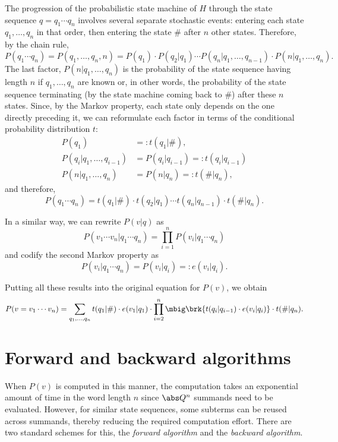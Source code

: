 The progression of the probabilistic state machine of $H$ through the state
sequence $q=q_1\cdots q_n$ involves several separate stochastic events:
entering each state $q_1,\ldots,q_n$ in that order, then entering the state
$\#$ after $n$ other states. Therefore, by the chain rule,
\[
 P(q_1\cdots q_n) = P(q_1,\ldots,q_n,n) = P(q_1) \cdot P(q_2|q_1) \cdots P(q_n|q_1,\ldots,q_{n-1}) \cdot P(n|q_1,\ldots,q_n).
\]
The last factor, $P(n|q_1,\ldots,q_n)$ is the probability of the state sequence
having length $n$ if $q_1,\ldots,q_n$ are known or, in other words, the
probability of the state sequence terminating (by the state machine coming back
to $\#$) after these $n$ states. Since, by the Markov property, each state only
depends on the one directly preceding it, we can reformulate each factor in
terms of the conditional probability distribution $t$:
\begin{align*}
 P(q_1) &=: t(q_1|\#), \\
 P(q_i|q_1,\ldots,q_{i-1}) &= P(q_i|q_{i-1}) =: t(q_i|q_{i-1}) \\
 P(n|q_1,\ldots,q_n) &= P(n|q_n) =: t(\#|q_n),
\end{align*}
and therefore,
\[
 P(q_1\cdots q_n) = t(q_1|\#) \cdot t(q_2|q_1) \cdots t(q_n|q_{n-1}) \cdot t(\#|q_n).
\]

In a similar way, we can rewrite $P(v|q)$ as
\[
 P(v_1\cdots v_n|q_1\cdots q_n) = \prod_{i=1}^n P(v_i|q_1\cdots q_n)
\]
and codify the second Markov property as
\[
 P(v_i|q_1\cdots q_n) = P(v_i|q_i) =: e(v_i|q_i).
\]

Putting all these results into the original equation for $P(v)$, we obtain
\[
 P(v=v_1\cdots v_n) = \sum_{q_1,\ldots,q_n} t(q_1|\#) \cdot e(v_1|q_1) \cdot \prod_{i=2}^n \mbig\brk{t(q_i|q_{i-1}) \cdot e(v_i|q_i)} \cdot t(\#|q_n).
\]

\section{Forward and backward algorithms}

When $P(v)$ is computed in this manner, the computation takes an exponential
amount of time in the word length $n$ since $\abs Q^n$ summands need to be
evaluated. However, for similar state sequences, some subterms can be reused
across summands, thereby reducing the required computation effort. There are
two standard schemes for this, the \emph{forward algorithm} and the
\emph{backward algorithm}.

